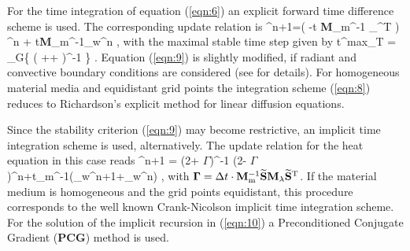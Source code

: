 \documentclass[twocolumn]{IEEEtran}
\newcommand{\fMm}{{\bf M}_{\rm m}}
\newcommand{\fMl}{{\bf M}_{\lambda}}
\begin{document}
For the time integration of equation (\ref{eqn:6}) an explicit forward
time difference scheme is used. The corresponding update relation is
\beq
\T^{n+1}=( \One -\Delta t \fMm^{-1} \St \fMl\St^{\rm T} )
\T^{n} + \Delta t\fMm^{-1}\q_w^n \; ,
\label{eqn:8}
\enq
with the maximal stable time step given by
\beq
\Delta t^{\srr max}_{\srr T} =
\min_G\left\{ \left(
++ \right)^{-1} \right\} \; .
\label{eqn:9}
\enq
Equation (\ref{eqn:9}) is slightly modified, if radiant and convective
boundary conditions are considered (see \cite{Pinder} for details).
For homogeneous material media and equidistant grid points the integration
scheme (\ref{eqn:8}) reduces to Richardson's explicit method for linear
diffusion equations.

Since the stability criterion (\ref{eqn:9}) may become restrictive,
an implicit time integration scheme is used, alternatively. The update
relation for the heat equation in this case reads
\beq
\T^{n+1} = (2\cdot\One + \mbox{\boldmath$\Gamma$})^{-1} (2\cdot\One -
\mbox{\boldmath$\Gamma$})\T^{n}+\Delta t\cdot\fMm^{-1}(\q_w^{n+1}+\q_w^n) \; ,
\label{eqn:10}
\enq
with $\mbox{\boldmath$\Gamma$}= \Delta t\cdot\fMm^{-1}\St\fMl\St^{\rm T}$.
If the material medium is homogeneous and the grid points equidistant,
this procedure corresponds to the well known Crank-Nicolson implicit
time integration scheme. For the solution of the implicit recursion in
(\ref{eqn:10}) a Preconditioned Conjugate Gradient ({\bf PCG}) method
is used.
\end{document}
